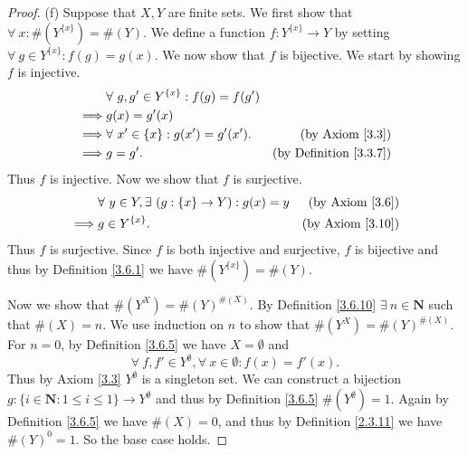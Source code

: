 \begin{proof}{(f)}
    Suppose that \(X, Y\) are finite sets.
    We first show that \(\forall\ x : \#(Y^{\{x\}}) = \#(Y)\).
    We define a function \(f : Y^{\{x\}} \to Y\) by setting \(\forall\ g \in Y^{\{x\}} : f(g) = g(x)\).
    We now show that \(f\) is bijective.
    We start by showing \(f\) is injective.
    \begin{align*}
                 & \forall\ g, g' \in Y^{\{x\}} : f(g) = f(g')                                      \\
        \implies & g(x) = g'(x)                                                                     \\
        \implies & \forall\ x' \in \{x\} : g(x') = g'(x').     & \text{(by Axiom \ref{3.3})}        \\
        \implies & g = g'.                                     & \text{(by Definition \ref{3.3.7})}
    \end{align*}
    Thus \(f\) is injective.
    Now we show that \(f\) is surjective.
    \begin{align*}
                 & \forall\ y \in Y, \exists\ (g : \{x\} \to Y) : g(x) = y & \text{(by Axiom \ref{3.6})}  \\
        \implies & g \in Y^{\{x\}}.                                        & \text{(by Axiom \ref{3.10})}
    \end{align*}
    Thus \(f\) is surjective.
    Since \(f\) is both injective and surjective, \(f\) is bijective and thus by Definition \ref{3.6.1} we have \(\#(Y^{\{x\}}) = \#(Y)\).

    Now we show that \(\#(Y^X) = \#(Y)^{\#(X)}\).
    By Definition \ref{3.6.10} \(\exists\ n \in \mathbf{N}\) such that \(\#(X) = n\).
    We use induction on \(n\) to show that \(\#(Y^X) = \#(Y)^{\#(X)}\).
    For \(n = 0\), by Definition \ref{3.6.5} we have \(X = \emptyset\) and
    \[
        \forall\ f, f' \in Y^\emptyset, \forall\ x \in \emptyset : f(x) = f'(x).
    \]
    Thus by Axiom \ref{3.3} \(Y^\emptyset\) is a singleton set.
    We can construct a bijection \(g : \{i \in \mathbf{N} : 1 \leq i \leq 1\} \to Y^\emptyset\) and thus by Definition \ref{3.6.5} \(\#(Y^\emptyset) = 1\).
    Again by Definition \ref{3.6.5} we have \(\#(X) = 0\), and thus by Definition \ref{2.3.11} we have \(\#(Y)^0 = 1\).
    So the base case holds.


\end{proof}
